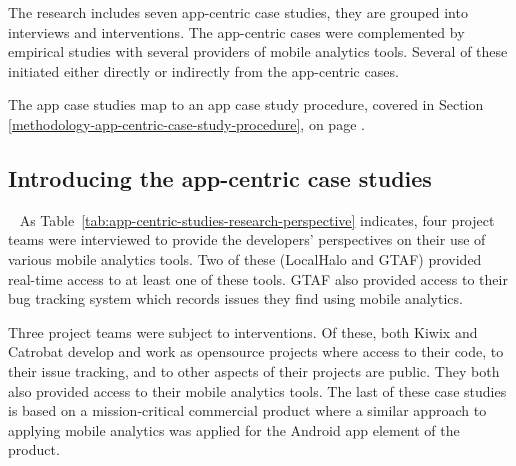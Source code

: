 The research includes seven app-centric case studies, they are grouped into interviews and interventions. The app-centric cases were complemented by empirical studies with several providers of mobile analytics tools. Several of these initiated either directly or indirectly from the app-centric cases. 


The app case studies map to an app case study procedure, covered in Section \ref{methodology-app-centric-case-study-procedure}, on page \pageref{methodology-app-centric-case-study-procedure}. 

\subsection{Introducing the app-centric case studies}~\label{methodology-introducing-the-app-centric-case-studies-section}
As Table~\ref{tab:app-centric-studies-research-perspective} indicates, four project teams were interviewed to provide the developers' perspectives on their use of various mobile analytics tools. Two of these (LocalHalo and GTAF) provided real-time access to at least one of these tools. GTAF also provided access to their bug tracking system which records issues they find using mobile analytics.

Three project teams were subject to interventions. Of these, both Kiwix and Catrobat develop and work as opensource projects where access to their code, to their issue tracking, and to other aspects of their projects are public. They both also provided access to their mobile analytics tools. The last of these case studies is based on a mission-critical commercial product where a similar approach to applying mobile analytics was applied for the Android app element of the product.

